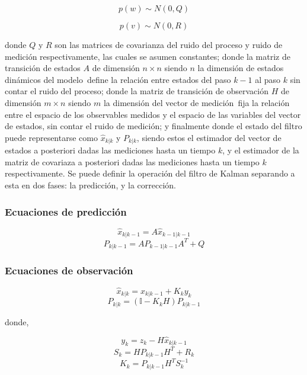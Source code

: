 \[ p(w) \sim N(0, Q) \]

\[ p(v) \sim N(0, R) \]

donde $Q$ y $R$ son las matrices de covarianza del ruido del proceso y ruido de medición respectivamente, las cuales se asumen constantes; donde la matriz de transición de estados $A$ de dimensión $n\times n$ \textemdash siendo $n$ la dimensión de estados dinámicos del modelo\textemdash \ define la relación entre estados del paso $k-1$ al paso $k$ sin contar el ruido del proceso; donde la matriz de transición de observación $H$ de dimensión $m\times n$ \textemdash siendo $m$ la dimensión del vector de medición\textemdash \  fija la relación entre el espacio de  los observables medidos y el espacio de las variables del vector de estados, sin contar el ruido de medición; y finalmente donde el estado del filtro puede representarse como $\hat{x}_{k|k}$ y $P_{k|k}$, siendo estos el estimador del vector de estados a posteriori dadas las mediciones hasta un tiempo $k$, y el estimador de la matriz de covariaza a posteriori dadas las mediciones hasta un tiempo $k$ respectivamente. Se puede definir la operación del filtro de Kalman separando a esta en dos fases: la predicción, y la corrección.

\subsubsection{Ecuaciones de predicción}

\begin{equation}
\hat{x}_{k|k-1} = A\hat{x}_{k-1|k-1}
\end{equation}
\begin{equation}
P_{k|k-1} = AP_{k-1|k-1}A^T + Q
\end{equation}

\subsubsection{Ecuaciones de observación}

\begin{equation}
\hat{x}_{k|k} = \hat{x}_{k|k-1} + K_k y_k
\end{equation}
\begin{equation}
P_{k|k} = (\mathbb{I}-K_kH)P_{k|k-1}
\end{equation}

donde,

\begin{equation}
y_k = z_k - H\hat{x}_{k|k-1}
\end{equation}
\begin{equation}
S_k = HP_{k|k-1}H^T + R_k
\end{equation}
\begin{equation}
K_k = P_{k|k-1}H^TS_k^{-1}
\end{equation}


